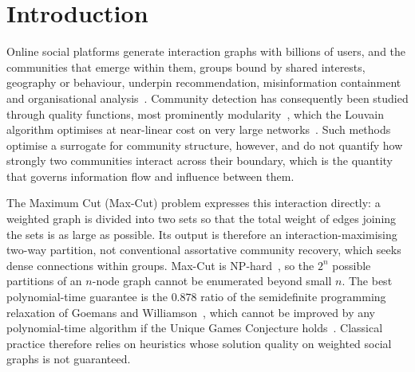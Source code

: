 \documentclass[pdflatex,sn-mathphys-num]{sn-jnl}
\theoremstyle{thmstyleone}
\theoremstyle{thmstyletwo}
\theoremstyle{thmstylethree}
\begin{document}

\maketitle

\section{Introduction}\label{sec:intro}

Online social platforms generate interaction graphs with billions of users, and the communities that emerge within them, groups bound by shared interests, geography or behaviour, underpin recommendation, misinformation containment and organisational analysis~\cite{fortunato2010community}. Community detection has consequently been studied through quality functions, most prominently modularity~\cite{newman2004finding}, which the Louvain algorithm optimises at near-linear cost on very large networks~\cite{blondel2008fast}. Such methods optimise a surrogate for community structure, however, and do not quantify how strongly two communities interact across their boundary, which is the quantity that governs information flow and influence between them.

The Maximum Cut (Max-Cut) problem expresses this interaction directly: a weighted graph is divided into two sets so that the total weight of edges joining the sets is as large as possible. Its output is therefore an interaction-maximising two-way partition, not conventional assortative community recovery, which seeks dense connections within groups. Max-Cut is NP-hard~\cite{karp1972reducibility}, so the $2^{n}$ possible partitions of an $n$-node graph cannot be enumerated beyond small $n$. The best polynomial-time guarantee is the $0.878$ ratio of the semidefinite programming relaxation of Goemans and Williamson~\cite{goemans1995improved}, which cannot be improved by any polynomial-time algorithm if the Unique Games Conjecture holds~\cite{khot2007optimal}. Classical practice therefore relies on heuristics whose solution quality on weighted social graphs is not guaranteed.
\end{document}
